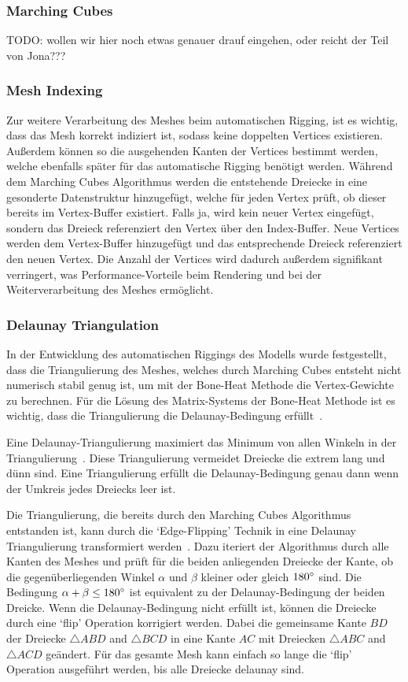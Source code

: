 \subsubsection{Marching Cubes}
TODO: wollen wir hier noch etwas genauer drauf eingehen, oder reicht der Teil von Jona???

\subsubsection{Mesh Indexing}
Zur weitere Verarbeitung des Meshes beim automatischen Rigging, ist es wichtig, dass das Mesh korrekt indiziert ist, sodass keine doppelten Vertices existieren. Außerdem können so die ausgehenden Kanten der Vertices bestimmt werden, welche ebenfalls später für das automatische Rigging benötigt werden. Während dem Marching Cubes Algorithmus werden die entstehende Dreiecke in eine gesonderte Datenstruktur hinzugefügt, welche für jeden Vertex prüft, ob dieser bereits im Vertex-Buffer existiert. Falls ja, wird kein neuer Vertex eingefügt, sondern das Dreieck referenziert den Vertex über den Index-Buffer. Neue Vertices werden dem Vertex-Buffer hinzugefügt und das entsprechende Dreieck referenziert den neuen Vertex. Die Anzahl der Vertices wird dadurch außerdem signifikant verringert, was Performance-Vorteile beim Rendering und bei der Weiterverarbeitung des Meshes ermöglicht.

\subsubsection{Delaunay Triangulation}
In der Entwicklung des automatischen Riggings des Modells wurde festgestellt, dass die Triangulierung des Meshes, welches durch Marching Cubes entsteht nicht numerisch stabil genug ist, um mit der Bone-Heat Methode die Vertex-Gewichte zu berechnen. Für die Lösung des Matrix-Systems der Bone-Heat Methode ist es wichtig, dass die Triangulierung die Delaunay-Bedingung erfüllt~\cite{laplace_beltrami_paper}.

Eine Delaunay-Triangulierung maximiert das Minimum von allen Winkeln in der Triangulierung~\cite{delaunay}. Diese Triangulierung vermeidet Dreiecke die extrem lang und dünn sind. Eine Triangulierung erfüllt die Delaunay-Bedingung genau dann wenn der Umkreis jedes Dreiecks leer ist.

Die Triangulierung, die bereits durch den Marching Cubes Algorithmus entstanden ist, kann durch die `Edge-Flipping' Technik in eine Delaunay Triangulierung transformiert werden~\cite{delaunay}. Dazu iteriert der Algorithmus durch alle Kanten des Meshes und prüft für die beiden anliegenden Dreiecke der Kante, ob die gegenüberliegenden Winkel $\alpha$ und $\beta$ kleiner oder gleich $180\degree$ sind. Die Bedingung $\alpha+\beta \leq 180\degree$ ist equivalent zu der Delaunay-Bedingung der beiden Dreicke. Wenn die Delaunay-Bedingung nicht erfüllt ist, können die Dreiecke durch eine `flip' Operation korrigiert werden. Dabei die gemeinsame Kante $BD$ der Dreiecke $\triangle ABD$ and $\triangle BCD$ in eine Kante $AC$ mit Dreiecken $\triangle ABC$ and $\triangle ACD$ geändert. Für das gesamte Mesh kann einfach so lange die `flip' Operation ausgeführt werden, bis alle Dreiecke delaunay sind.

